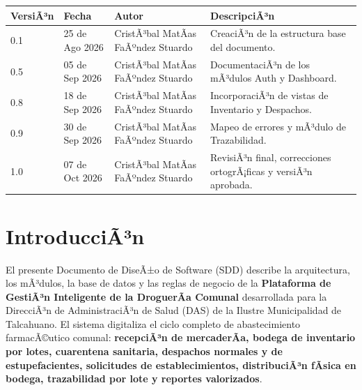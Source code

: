﻿\documentclass[a4paper, 12pt]{article}
\begin{document}
\vspace{0.5cm}
\noindent
\renewcommand{\arraystretch}{1.5} %
\begin{tabularx}{\textwidth}{@{} l l >{\raggedright\arraybackslash}p{4.5cm} >{\raggedright\arraybackslash}X @{}}
\toprule
\textbf{VersiÃ³n} & \textbf{Fecha} & \textbf{Autor} & \textbf{DescripciÃ³n} \\
\midrule
0.1 & 25 de Ago 2026 & CristÃ³bal MatÃ­as FaÃºndez Stuardo & CreaciÃ³n de la estructura base del documento. \\
0.5 & 05 de Sep 2026 & CristÃ³bal MatÃ­as FaÃºndez Stuardo & DocumentaciÃ³n de los mÃ³dulos Auth y Dashboard. \\
0.8 & 18 de Sep 2026 & CristÃ³bal MatÃ­as FaÃºndez Stuardo & IncorporaciÃ³n de vistas de Inventario y Despachos. \\
0.9 & 30 de Sep 2026 & CristÃ³bal MatÃ­as FaÃºndez Stuardo & Mapeo de errores y mÃ³dulo de Trazabilidad. \\
1.0 & 07 de Oct 2026 & CristÃ³bal MatÃ­as FaÃºndez Stuardo & RevisiÃ³n final, correcciones ortogrÃ¡ficas y versiÃ³n aprobada. \\
\bottomrule
\end{tabularx}
\renewcommand{\arraystretch}{1} %

\newpage
\tableofcontents
\newpage


\section{IntroducciÃ³n}

El presente Documento de DiseÃ±o de Software (SDD) describe la arquitectura, los mÃ³dulos, la base de datos y las reglas de negocio de la \textbf{Plataforma de GestiÃ³n Inteligente de la DroguerÃ­a Comunal} desarrollada para la DirecciÃ³n de AdministraciÃ³n de Salud (DAS) de la Ilustre Municipalidad de Talcahuano. El sistema digitaliza el ciclo completo de abastecimiento farmacÃ©utico comunal: \textbf{recepciÃ³n de mercaderÃ­a, bodega de inventario por lotes, cuarentena sanitaria, despachos normales y de estupefacientes, solicitudes de establecimientos, distribuciÃ³n fÃ­sica en bodega, trazabilidad por lote y reportes valorizados}.
\end{document}
